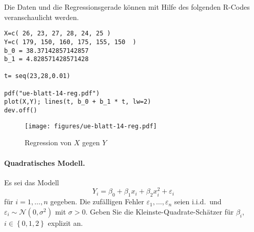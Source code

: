 Die Daten und die Regressionsgerade können mit Hilfe des folgenden R-Codes veranschaulicht werden. 
\begin{lstlisting}
X=c( 26, 23, 27, 28, 24, 25 )
Y=c( 179, 150, 160, 175, 155, 150  )
b_0 = 38.37142857142857
b_1 = 4.828571428571428

t= seq(23,28,0.01)

pdf("ue-blatt-14-reg.pdf")
plot(X,Y); lines(t, b_0 + b_1 * t, lw=2)
dev.off()
\end{lstlisting}

\begin{figure}[htb]
    \begin{center}
        \texttt{[image: figures/ue-blatt-14-reg.pdf]}
    \end{center}
    \caption{Regression von $X$ gegen $Y$}
    \label{fig:reg}
\end{figure}







\paragraph{Quadratisches Modell. }  Es sei das Modell
\begin{equation}
    Y_i = \beta_0 + \beta_1 x_i + \beta_2 x_{i}^2 + \varepsilon_i
\end{equation}
für $i=1,\ldots,n$ gegeben. Die zufälligen Fehler $\varepsilon_1,\ldots,\varepsilon_n$ 
seien i.i.d.\ und $\varepsilon_i\sim \mathcal N(0,\sigma^2)$ mit $\sigma>0$.
Geben Sie die Kleinste-Quadrate-Schätzer für $\beta_i$, $i\in \left\{ 0,1,2 \right\}$ explizit an.

